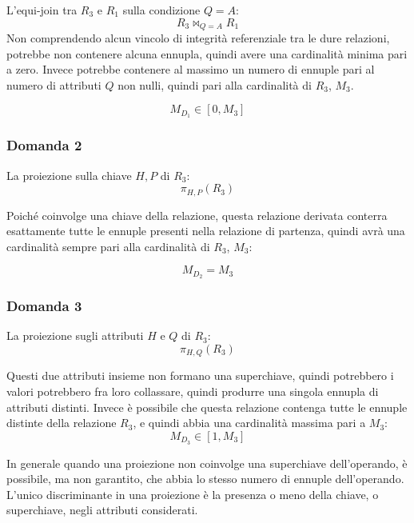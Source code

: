 \documentclass{article}
\begin{document}
L'equi-join tra $R_3$ e $R_1$ sulla condizione $Q=A$:
\begin{equation*}
    R_3\Join_{Q=A}R_1
\end{equation*}
Non comprendendo alcun vincolo di integrità referenziale tra le dure relazioni, potrebbe non contenere alcuna ennupla, quindi avere una cardinalità minima pari a zero. 
Invece potrebbe contenere al massimo un numero di ennuple pari al numero di attributi $Q$ non nulli, quindi pari alla cardinalità di $R_3$, $M_3$. 

\begin{equation}
    M_{D_1}\in[0,M_3]
\end{equation}

\subsubsection*{Domanda 2}

La proiezione sulla chiave $H,P$ di $R_3$:
\begin{equation*}
    \pi_{H,P}(R_3)
\end{equation*}

Poiché coinvolge una chiave della relazione, questa relazione derivata conterra esattamente tutte le ennuple presenti nella relazione di partenza, quindi avrà una cardinalità sempre pari 
alla cardinalità di $R_3$, $M_3$: 

\begin{equation}
    M_{D_2}=M_3
\end{equation}

\subsubsection*{Domanda 3}

La proiezione sugli attributi $H$ e $Q$ di $R_3$:
\begin{equation*}
    \pi_{H,Q}(R_3)
\end{equation*}

Questi due attributi insieme non formano una superchiave, quindi potrebbero i valori potrebbero fra loro collassare, quindi produrre una singola ennupla di attributi distinti. Invece è 
possibile che questa relazione contenga tutte le ennuple distinte della relazione $R_3$, e quindi abbia una cardinalità massima pari a $M_3$:
\begin{equation}
    M_{D_3}\in[1,M_3]
\end{equation}

In generale quando una proiezione non coinvolge una superchiave dell'operando, è possibile, ma non garantito, che abbia lo stesso numero di ennuple dell'operando. L'unico discriminante in una proiezione è la presenza 
o meno della chiave, o superchiave, negli attributi considerati. 
\end{document}
